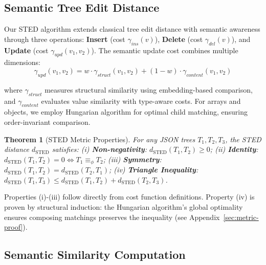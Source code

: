 \documentclass{article}
\newtheorem{theorem}{Theorem}
\begin{document}
\subsection{Semantic Tree Edit Distance}

Our STED algorithm extends classical tree edit distance with semantic awareness through three operations: \textbf{Insert} (cost $\gamma_{ins}(v)$), \textbf{Delete} (cost $\gamma_{del}(v)$), and \textbf{Update} (cost $\gamma_{upd}(v_1, v_2)$). The semantic update cost combines multiple dimensions:
\vspace{-2mm}
\begin{equation}
\gamma_{upd}(v_1, v_2) = w \cdot \gamma_{struct}(v_1, v_2) + (1-w) \cdot \gamma_{content}(v_1, v_2)
\end{equation}

where $\gamma_{struct}$ measures structural similarity using embedding-based comparison, and $\gamma_{content}$ evaluates value similarity with type-aware costs. For arrays and objects, we employ Hungarian algorithm for optimal child matching, ensuring order-invariant comparison.

\begin{theorem}[STED Metric Properties]
\label{thm:metric}
For any JSON trees $T_1, T_2, T_3$, the STED distance $d_{\text{STED}}$ satisfies: (i) \textbf{Non-negativity}: $d_{\text{STED}}(T_1, T_2) \geq 0$; (ii) \textbf{Identity}: $d_{\text{STED}}(T_1, T_2) = 0 \Leftrightarrow T_1 \equiv_{\phi} T_2$; (iii) \textbf{Symmetry}: $d_{\text{STED}}(T_1, T_2) = d_{\text{STED}}(T_2, T_1)$; (iv) \textbf{Triangle Inequality}: $d_{\text{STED}}(T_1, T_3) \leq d_{\text{STED}}(T_1, T_2) + d_{\text{STED}}(T_2, T_3)$.
\end{theorem}
\vspace{-1mm}
\noindent Properties (i)-(iii) follow directly from cost function definitions. Property (iv) is proven by structural induction: the Hungarian algorithm's global optimality ensures composing matchings preserves the inequality (see Appendix~\ref{sec:metric-proof}).

\subsection{Semantic Similarity Computation}
\end{document}
